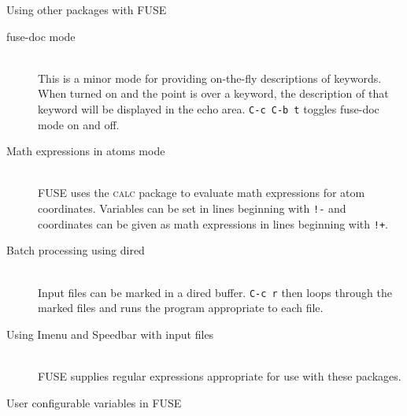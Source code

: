 \documentclass[twocolumn]{article}
\newenvironment{Boxedminipage}%
{\begin{Sbox}\begin{minipage}}%
  {\end{minipage}\end{Sbox}\Ovalbox{\TheSbox}}
\def\FUSE{{\textsf{FUSE}}}
\begin{document}
\begin{center}
  \begin{Boxedminipage}{0.8\linewidth}
    \begin{center}
      {\large Using other packages with {\FUSE}}
    \end{center}
  \end{Boxedminipage}
\end{center}
\begin{description}
\item[fuse-doc mode] \hfill\\ This is a minor mode for providing
  on-the-fly descriptions of keywords.  When turned on and the point
  is over a keyword, the description of that keyword will be displayed
  in the echo area.  \texttt{C-c C-b t} toggles fuse-doc mode on and
  off.
\item[Math expressions in atoms mode] \hfill\\ {\FUSE} uses the
  \textsc{calc} package to evaluate math expressions for atom
  coordinates.  Variables can be set in lines beginning with
  \texttt{!-} and coordinates can be given as math expressions in
  lines beginning with \texttt{!+}.
\item[Batch processing using dired] \hfill\\ Input files can be marked
  in a dired buffer.  \texttt{C-c r} then loops through the marked
  files and runs the program appropriate to each file.
\item[Using Imenu and Speedbar with input files] \hfill\\ {\FUSE}
  supplies regular expressions appropriate for use with these
  packages.
\end{description}


\vfill \pagebreak



\vspace{1truecm}

\begin{center}
  \begin{Boxedminipage}{0.95\linewidth}
    \begin{center}
      {\large User configurable variables in {\FUSE}}
    \end{center}
  \end{Boxedminipage}
\end{center}
\end{document}
